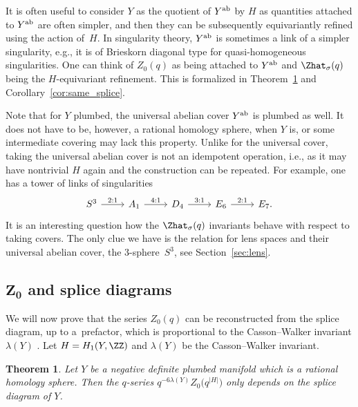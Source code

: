 \documentclass[10pt,a4paper]{amsart}
\newtheorem{Theorem}{Theorem}[section]
\begin{document}
It is often useful to consider $Y$ as the quotient of $Y^{\rm ab}$ by $H$ as quantities attached to $Y^{\rm ab}$ are often simpler, and then they can be subsequently equivariantly refined using the action of~$H$. In singularity theory, $Y^{\rm ab}$ is sometimes a link of a simpler singularity, e.g., it is of Brieskorn diagonal type for quasi-homogeneous singularities. One can think of $Z_0(q)$ as being attached to $Y^{\rm ab}$ and $\Zhat_\sigma(q)$ being the $H$-equivariant refinement. This is formalized in Theorem~\ref{thm:plumbing} and Corollary~\ref{cor:same_splice}.

Note that for $Y$ plumbed, the universal abelian cover $Y^{\rm ab}$ is plumbed as well. It does not have to be, however, a rational homology sphere, when $Y$ is, or some intermediate covering may lack this property. Unlike for the universal cover, taking the universal abelian cover is not an idempotent operation, i.e., as it may have nontrivial $H$ again and the construction can be repeated. For example, one has a tower of links of singularities
	\[
		\begin{tikzcd}
			S^3 \arrow[r, "{2:1}"] & A_1 \arrow[r, "{4:1}"] & D_4 \arrow[r, "{3:1}"] & E_6 \arrow[r, "{2:1}"] & E_7.
		\end{tikzcd}
	\]
It is an interesting question how the $\Zhat_\sigma(q)$ invariants behave with respect to taking covers. The only clue we have is the relation for lens spaces and their universal abelian cover, the 3-sphere~$S^3$, see Section~\ref{sec:lens}.

\subsection[Z_0 and splice diagrams]{$\boldsymbol{Z_0}$ and splice diagrams}

We will now prove that the series $Z_0(q)$ can be reconstructed from the splice diagram, up to a~prefactor, which is proportional to the Casson--Walker invariant $\lambda(Y)$ \cite{Wa92}. Let $H = H_1(Y, \ZZ)$ and $\lambda(Y)$ be the Casson--Walker invariant.
%
\begin{Theorem}\label{thm:plumbing}
	Let $Y$ be a negative definite plumbed manifold which is a rational homology sphere. Then the $q$-series
$
		q^{-6 \lambda(Y)} Z_{0}\bigl(q^{|H|}\bigr)
$
	only depends on the splice diagram of $Y$.
\end{Theorem}
\end{document}
